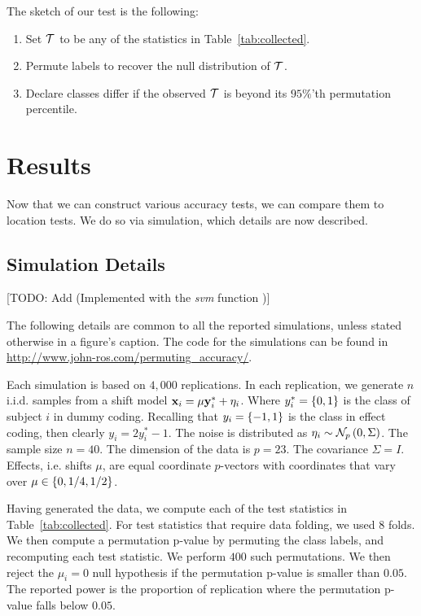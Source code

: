 \documentclass[12pt,a4paper]{article}
\begin{document}
The sketch of our test is the following:
\begin{enumerate}\itemsep0em 
	\item Set $\mathcal{T}$ to be any of the statistics in Table~\ref{tab:collected}.
	\item Permute labels to recover the null distribution of $\mathcal{T}$. 
	\item Declare classes differ if the observed $\mathcal{T}$ is beyond its $95\%$'th permutation percentile.  
\end{enumerate}





\section{Results}

Now that we can construct various accuracy tests, we can compare them to location tests. 
We do so via simulation, which details are now described.



\subsection{Simulation Details}
\label{apx:simulation_details}

[TODO: Add (Implemented with the \emph{svm} \R function \citep{meyer_e1071:_2015})]

The following details are common to all the reported simulations, unless stated otherwise in a figure's caption. 
The \R code for the simulations can be found in \url{http://www.john-ros.com/permuting_accuracy/}.

Each simulation is based on $4,000$ replications. 
In each replication, we generate $n$ i.i.d. samples from a shift model $\mathbf{x}_i = \mu \mathbf{y}^*_i + \eta_i$.
Where $y^*_i=\{ 0,1 \}$ is the class of subject $i$ in dummy coding. 
Recalling that $y_i=\{ -1,1 \}$ is the class in effect coding, then clearly $y_i=2 y^*_i-1$.
The noise is distributed as $\eta_i \sim \mathcal{N}_{p}\left(0,\Sigma\right)$. 
The sample size $n=40$. 
The dimension of the data is $p=23$. 
The covariance $\Sigma=I$. 
Effects, i.e. shifts $\mu$, are equal coordinate $p$-vectors with coordinates that vary over $\mu \in \{ 0,1/4,1/2 \}$.

Having generated the data, we compute each of the test statistics in Table~\ref{tab:collected}.
For test statistics that require data folding, we used $8$ folds. 
We then compute a permutation p-value by permuting the class labels, and recomputing each test statistic. 
We perform $400$ such permutations. 
We then reject the $\mu_i=0$ null hypothesis if the permutation p-value is smaller than $0.05$.
The reported power is the proportion of replication where the permutation p-value falls below $0.05$.
\end{document}
